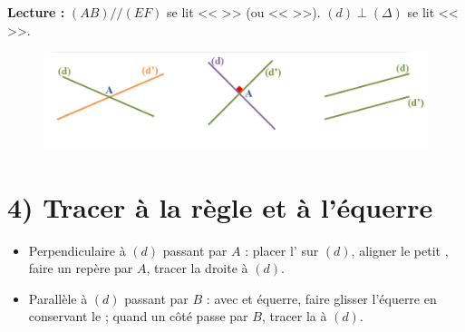 \textbf{Lecture :} $(AB)//(EF)$ se lit << \trou{5cm} >> (ou << \trou{5cm} >>). \quad $(d)\perp(\Delta)$ se lit << \trou{5cm} >>.

\begin{figure}[h]
	\centering
	\includegraphics[width=1\linewidth]{../../../assets/images/6e/seq_02/position_relative.png}
	\label{fig:Position relative de droites}
\end{figure}

\section*{4) Tracer à la règle et à l'équerre}
\begin{itemize}
	\item Perpendiculaire à $(d)$ passant par $A$ : placer l'\trou{2.5cm} sur $(d)$, aligner le petit \trou{2.3cm}, faire un repère par $A$, tracer la droite \trou{2.3cm} à $(d)$.
	\item Parallèle à $(d)$ passant par $B$ : avec \trou{2.3cm} et équerre, faire glisser l'équerre en conservant le \trou{2.3cm} ; quand un côté passe par $B$, tracer la \trou{2.3cm} à $(d)$.
\end{itemize}

